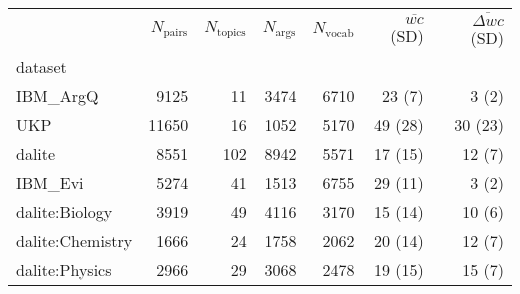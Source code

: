 \newlength{\digitlen}
\settowidth{\digitlen}{0}
\begin{tabular}{lrrrrrr}
\toprule
{} &  $N_{\mathrm{pairs}}$ &  $N_{\mathrm{topics}}$ &  $N_{\mathrm{args}}$  &  $N_{\mathrm{vocab}}$ & 
$\overline{wc}$ (SD) & 
$\overline{\Delta wc}$ (SD)\\
dataset          &          &           &         &        &              &                   \\
\midrule
IBM\_ArgQ         &     9125 &        11 &    3474 &   6710 &       23 (\hspace{\digitlen}7) &             3 (\hspace{\digitlen}2) \\
UKP              &    11650 &        16 &    1052 &   5170 &      49 (28) &           30 (23) \\
dalite           &     8551 &       102 &    8942 &   5571 &      17 (15) 
&            12 (\hspace{\digitlen}7) \\
IBM\_Evi          &     5274 &        41 &    1513 &   6755 &      29 (11) &             3 (\hspace{\digitlen}2) \\
dalite:Biology   &     3919 &        49 &    4116 &   3170 &      15 (14) 
&            10 (\hspace{\digitlen}6) \\
dalite:Chemistry &     1666 &        24 &    1758 &   2062 &      20 (14) 
&            12 (\hspace{\digitlen}7) \\
dalite:Physics   &     2966 &        29 &    3068 &   2478 &      19 (15) 
&            15 (\hspace{\digitlen}7) \\
\bottomrule
\end{tabular}
